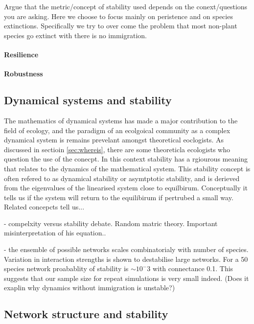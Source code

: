 Argue that the metric/concept of stability used depends on the conext/questions you are asking. Here we choose to focus mainly on peristence and on species extinctions. Specifically we try to over come the problem that most non-plant species go extinct with there is no immigration. 

\paragraph{Resilience}
\paragraph{Robustness}


\subsection{Dynamical systems and stability}

The mathematics of dynamical systems has made a major contribution to the field of ecology, and the paradigm of an ecolgoical community as a complex dynamical system is remains prevelant amongst theoretical eoclogists. As discussed in sectioin \ref{sec:whereis}, there are some theoreticla ecologists who question the use of the conecpt. In this context stability has a rgiourous meaning that relates to the dynamics of the mathematical system. This stability concept is often refered to as dynamical stability or asymtptotic stability, and is derieved from the eigenvalues of the linearised system close to equilbirum. Conceptually it tells us if the system will return to the equilibirum if pertrubed a small way. Related concepcts tell us...\cite{arnoldi2015} 

\cite{may1972will} - compelxity versus stability debate. Random matric theory. Important misinterpretation of his equation..

\cite{gross2009generalized} - the ensemble of possible networks scales combinatorialy with number of species. Variation in interaction strengths is shown to destabilise large networks. For a 50 species network proabablity of stability is $\sim 10^-3$ with connectance 0.1. This suggests that our sample size for repeat simulations is very small indeed. (Does it exaplin why dynamics without immigration is unstable?) 

\subsection{Network structure and stability}
\label{sec:lit_ns_stab}

